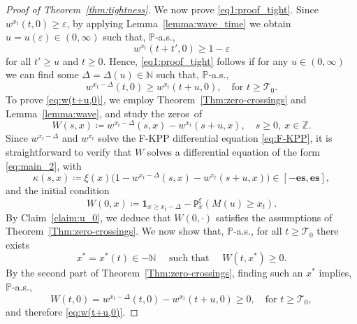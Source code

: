 \documentclass[12pt,reqno,oneside]{amsart}
\numberwithin{equation}{section}
\theoremstyle{definition}
\theoremstyle{remark}
\newcommand{\N}{\mathbb{N}}
\newcommand{\Z}{\mathbb{Z}}
\newcommand{\PP}{\mathbb{P}}
\newcommand{\es}{\mathbf{es}}
\newcommand{\bbone}{\boldsymbol 1}
\begin{document}
\begin{proof}[Proof of Theorem~\ref{thm:tightness}]
  We now prove \eqref{eq1:proof_tight}.
  Since $w^{x_t}(t,0) \geq \varepsilon$, by applying Lemma~\ref{lemma:wave_time} we
  obtain $u=u(\varepsilon) \in (0,\infty)$ such that, $\PP$-a.s.,
  \begin{equation*}
    w^{x_t}(t+t',0) \geq 1 - \varepsilon
  \end{equation*}
   for all  $t' \geq u$ and $t\geq0$.
   Hence, \eqref{eq1:proof_tight} follows
  if for any $u\in (0,\infty)$ we can find some
  $\Delta= \Delta(u) \in \N$ such that, $\PP$-a.s.,
  \begin{equation}\label{eq:w(t+u,0)}
    w^{x_t- \Delta}(t,0)
    \geq w^{x_t}(t+u,0), \quad \text{for } t \geq \mathcal{T}_0.
  \end{equation}
  To prove \eqref{eq:w(t+u,0)}, we employ Theorem~\ref{Thm:zero-crossings}
  and Lemma~\ref{lemma:wave}, and study the zeros~of
  \begin{equation*}
    W(s,x)\coloneq w^{x_t- \Delta}(s,x) -w^{x_t}(s+u,x), \quad s
    \geq 0, \ x \in \Z.
  \end{equation*}
  Since $w^{x_t-\Delta}$ and $w^{x_t}$ solve the F-KPP differential equation
  \eqref{eq:F-KPP}, it is straightforward to verify that $W$ solves a
  differential equation of the form \eqref{eq:main_2}, with
  \begin{equation*}
    \kappa(s,x)\coloneq\xi(x)\big(1-w^{x_t-\Delta}(s,x)-w^{x_t}(s+u,x)\big)
    \in [-\es, \es],
  \end{equation*}
  and the initial condition
  \begin{equation*}
    W(0,x)\coloneq\bbone_{x \geq x_t-\Delta}- \mathtt{P}^\xi_x(M(u) \geq x_t).
  \end{equation*}
  By Claim~\ref{claim:u_0}, we deduce that $W(0,\cdot)$ satisfies
  the assumptions of Theorem~\ref{Thm:zero-crossings}. We now show that,  $\PP$-a.s., for all
  $t \geq \mathcal{T}_0$ there exists
  \begin{equation}\label{eq:x^*}
    x^*=x^*(t) \in -\N \quad \text{ such that } \quad W(t,x^*)\geq 0.
  \end{equation}
  By the second part of
  Theorem~\ref{Thm:zero-crossings}, finding such an $x^*$ implies, $\PP$-a.s.,
  \begin{equation*}
    W(t,0)=w^{x_t- \Delta}(t,0) -w^{x_t}(t+u,0)
    \geq 0, \quad  \text{for } t \geq \mathcal{T}_0,
  \end{equation*}
  and therefore \eqref{eq:w(t+u,0)}.


\end{proof}
\end{document}
